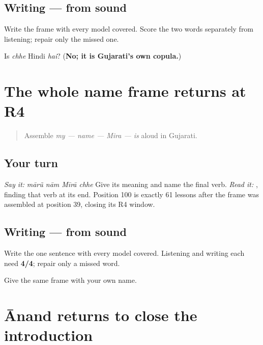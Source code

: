 \subsection*{Writing — from sound}
Write the frame with every model covered. Score the two words separately from listening; repair only the missed one.

\begin{tcolorbox}[breakable,colback=teal!4,colframe=teal!35!black,title={Before you move on}]
Is \emph{chhe} Hindi \emph{hai}? (\textbf{No; it is Gujarati's own copula.})
\end{tcolorbox}
\section[Practice]{The whole name frame returns at R4}

\label{lesson:GU-R16-my-name-is-r4}



\begin{quote}
Assemble \emph{my — name — Mira — is} aloud in Gujarati.
\end{quote}

\subsection*{Your turn}
\emph{Say it:} \emph{mārũ nām Mīrā chhe} Give its meaning and name the final verb. \emph{Read it:} \textbf{   }, finding that verb at its end. Position 100 is exactly 61 lessons after the frame was assembled at position 39, closing its R4 window.

\subsection*{Writing — from sound}
Write the one sentence with every model covered. Listening and writing each need \textbf{4/4}; repair only a missed word.

\begin{tcolorbox}[breakable,colback=teal!4,colframe=teal!35!black,title={Before you move on}]
Give the same frame with your own name.
\end{tcolorbox}
\section[Practice]{Ānand returns to close the introduction}

\label{lesson:GU-R16-anand-r4}



